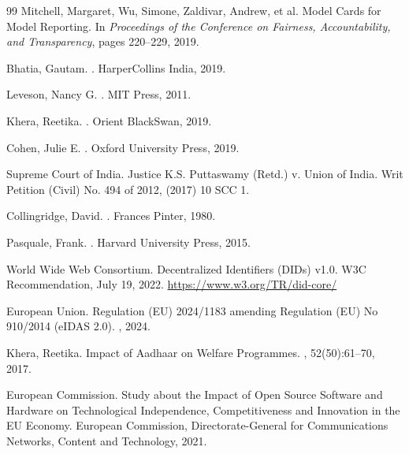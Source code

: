 \documentclass{article}
\begin{document}
\begin{thebibliography}{99}
Mitchell, Margaret, Wu, Simone, Zaldivar, Andrew, et al.
\newblock Model Cards for Model Reporting.
\newblock In {\em Proceedings of the Conference on Fairness, Accountability, and Transparency}, pages 220--229, 2019.

Bhatia, Gautam.
.
\newblock HarperCollins India, 2019.

Leveson, Nancy G.
.
\newblock MIT Press, 2011.

Khera, Reetika.
.
\newblock Orient BlackSwan, 2019.

Cohen, Julie E.
.
\newblock Oxford University Press, 2019.

Supreme Court of India.
\newblock Justice K.S. Puttaswamy (Retd.) v. Union of India.
\newblock Writ Petition (Civil) No. 494 of 2012, (2017) 10 SCC 1.

Collingridge, David.
.
\newblock Frances Pinter, 1980.

Pasquale, Frank.
.
\newblock Harvard University Press, 2015.

World Wide Web Consortium.
\newblock Decentralized Identifiers (DIDs) v1.0.
\newblock W3C Recommendation, July 19, 2022.
\newblock \url{https://www.w3.org/TR/did-core/}

European Union.
\newblock Regulation (EU) 2024/1183 amending Regulation (EU) No 910/2014 (eIDAS 2.0).
, 2024.

Khera, Reetika.
\newblock Impact of Aadhaar on Welfare Programmes.
, 52(50):61--70, 2017.

European Commission.
\newblock Study about the Impact of Open Source Software and Hardware on Technological Independence, Competitiveness and Innovation in the EU Economy.
\newblock European Commission, Directorate-General for Communications Networks, Content and Technology, 2021.


\end{thebibliography}
\end{document}
